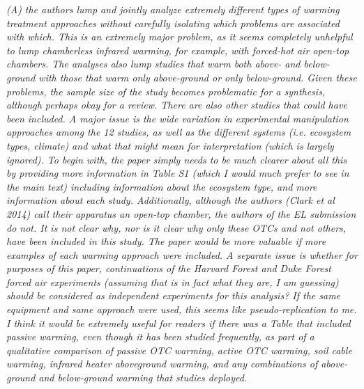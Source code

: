\documentclass[11pt,a4paper]{letter}
\begin{document}
\begin{letter}{}
\par \emph{(A) the authors lump and jointly analyze extremely different types of warming treatment approaches without carefully isolating which problems are associated with which. This is an extremely major problem, as it seems completely unhelpful to lump chamberless infrared warming, for example, with forced-hot air open-top chambers. The analyses also lump studies that warm both above- and below-ground with those that warm only above-ground or only below-ground. Given these problems, the sample size of the study becomes problematic for a synthesis, although perhaps okay for a review. There are also other studies that could have been included. A major issue is the wide variation in experimental manipulation approaches among the 12 studies, as well as the different systems (i.e. ecosystem types, climate) and what that might mean for interpretation (which is largely ignored). To begin with, the paper simply needs to be much clearer about all this by providing more information in Table S1 (which I would much prefer to see in the main text) including information about the ecosystem type, and more information about each study. Additionally, although the authors (Clark et al 2014) call their apparatus an open-top chamber, the authors of the EL submission do not. It is not clear why, nor is it clear why only these OTCs and not others, have been included in this study. The paper would be more valuable if more examples of each warming approach were included. A separate issue is whether for purposes of this paper, continuations of the Harvard Forest and Duke Forest forced air experiments (assuming that is in fact what they are, I am guessing) should be considered as independent experiments for this analysis? If the same equipment and same approach were used, this seems like pseudo-replication to me. I think it would be extremely useful for readers if there was a Table that included passive warming, even though it has been studied frequently, as part of a qualitative comparison of passive OTC warming, active OTC warming, soil cable warming, infrared heater aboveground warming, and any combinations of above-ground and below-ground warming that studies deployed.}


\end{letter}
\end{document}
